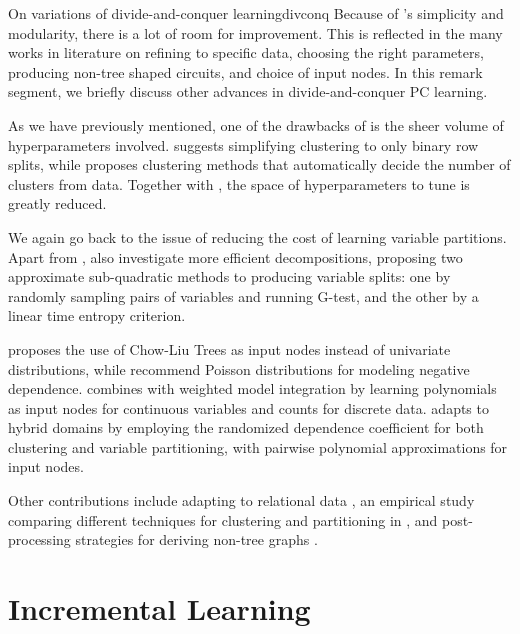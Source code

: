 \begin{remark}[breakable]{On variations of divide-and-conquer learning}{divconq}
  Because of 's simplicity and modularity, there is a lot of room for
  improvement. This is reflected in the many works in literature on refining  to
  specific data, choosing the right parameters, producing non-tree shaped circuits, and choice of
  input nodes. In this remark segment, we briefly discuss other advances in divide-and-conquer PC
  learning.

  As we have previously mentioned, one of the drawbacks of  is the sheer volume
  of hyperparameters involved. \citet{vergari15} suggests simplifying clustering to only binary row
  splits, while \citet{liu19} proposes clustering methods that automatically decide the number of
  clusters from data. Together with , the space of hyperparameters to tune is
  greatly reduced.

  We again go back to the issue of reducing the cost of learning variable partitions. Apart
  from , \citet{dimauro17a} also investigate more efficient decompositions,
  proposing two approximate sub-quadratic methods to producing variable splits: one by randomly
  sampling pairs of variables and running G-test, and the other by a linear time entropy criterion.

  \citet{vergari15} proposes the use of Chow-Liu Trees as input nodes instead of univariate
  distributions, while \citet{molina17} recommend Poisson distributions for modeling negative
  dependence. \citet{bueff18} combines  with weighted model integration by
  learning polynomials as input nodes for continuous variables and counts for discrete data.
  \citet{molina18} adapts  to hybrid domains by employing the randomized
  dependence coefficient for both clustering and variable partitioning, with pairwise polynomial
  approximations for input nodes.

  Other contributions include adapting  to relational data \citep{nath15}, an
  empirical study comparing different techniques for clustering and partitioning in
   \citep{butz18a}, and  post-processing strategies for
  deriving non-tree graphs \citep{tahrima16}.
\end{remark}

\section{Incremental Learning}
\label{sec:incremental}

